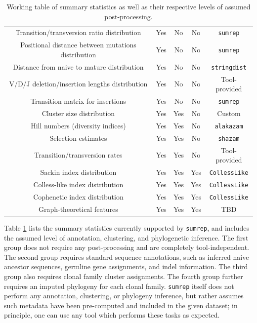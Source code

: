 \documentclass{article}
\begin{document}
\begin{table}
{\begin{tabular}{c|c|c|c|c}
Transition/transversion ratio distribution & Yes & No & No & \texttt{sumrep} \\
Positional distance between mutations distribution & Yes & No & No & \texttt{sumrep}  \\
Distance from naive to mature distribution & Yes & No & No & \texttt{stringdist} \\
V/D/J deletion/insertion lengths distribution & Yes & No & No & Tool-provided \\
Transition matrix for insertions & Yes & No & No & \texttt{sumrep} \\
\hline
Cluster size distribution & Yes & Yes & No & Custom \\
Hill numbers (diversity indices) & Yes & Yes & No & \texttt{alakazam} \\
Selection estimates & Yes & Yes & No & \texttt{shazam} \\
Transition/transversion rates & Yes & Yes & No & Tool-provided \\
\hline
    Sackin index distribution & Yes & Yes & Yes & \texttt{CollessLike} \cite{Mir2018-lk} \\
Colless-like index distribution & Yes & Yes & Yes & \texttt{CollessLike} \\
Cophenetic index distribution & Yes & Yes & Yes & \texttt{CollessLike} \\
Graph-theoretical features & Yes & Yes & Yes & TBD \\
\end{tabular}
}
\caption{Working table of summary statistics as well as their respective levels of assumed post-processing.}
\label{tab:SummaryStatistics}
\end{table}

Table \ref{tab:SummaryStatistics} lists the summary statistics currently supported by \texttt{sumrep}, and includes the assumed level of annotation, clustering, and phylogenetic inference.
The first group does not require any post-processing and are completely tool-independent.
The second group requires standard sequence annotations, such as inferred naive ancestor sequences, germline gene assignments, and indel information.
The third group also requires clonal family cluster assignments.
The fourth group further requires an imputed phylogeny for each clonal family.
\texttt{sumrep} itself does not perform any annotation, clustering, or phylogeny inference, but rather assumes such metadata have been pre-computed and included in the given dataset; in principle, one can use any tool which performs these tasks as expected.
\end{document}
